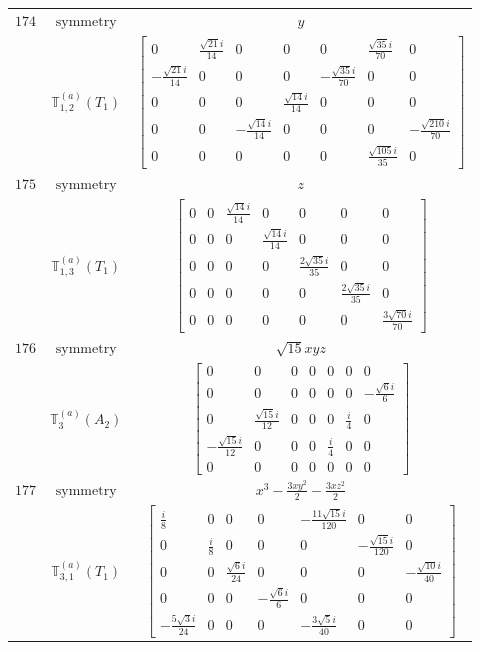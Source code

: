 \documentclass[fleqn,8pt,landscape]{jsarticle}
\begin{document}
\begin{longtable}{ccc}
$ 174 $ & $ \text{symmetry} $ & $ y $ \\
$  $ & $ \mathbb{T}_{1,2}^{(a)}(T_{1}) $ & $ \begin{bmatrix} 0 & \frac{\sqrt{21} i}{14} & 0 & 0 & 0 & \frac{\sqrt{35} i}{70} & 0 \\ - \frac{\sqrt{21} i}{14} & 0 & 0 & 0 & - \frac{\sqrt{35} i}{70} & 0 & 0 \\ 0 & 0 & 0 & \frac{\sqrt{14} i}{14} & 0 & 0 & 0 \\ 0 & 0 & - \frac{\sqrt{14} i}{14} & 0 & 0 & 0 & - \frac{\sqrt{210} i}{70} \\ 0 & 0 & 0 & 0 & 0 & \frac{\sqrt{105} i}{35} & 0 \end{bmatrix} $ \\ \hline
$ 175 $ & $ \text{symmetry} $ & $ z $ \\
$  $ & $ \mathbb{T}_{1,3}^{(a)}(T_{1}) $ & $ \begin{bmatrix} 0 & 0 & \frac{\sqrt{14} i}{14} & 0 & 0 & 0 & 0 \\ 0 & 0 & 0 & \frac{\sqrt{14} i}{14} & 0 & 0 & 0 \\ 0 & 0 & 0 & 0 & \frac{2 \sqrt{35} i}{35} & 0 & 0 \\ 0 & 0 & 0 & 0 & 0 & \frac{2 \sqrt{35} i}{35} & 0 \\ 0 & 0 & 0 & 0 & 0 & 0 & \frac{3 \sqrt{70} i}{70} \end{bmatrix} $ \\ \hline
$ 176 $ & $ \text{symmetry} $ & $ \sqrt{15} x y z $ \\
$  $ & $ \mathbb{T}_{3}^{(a)}(A_{2}) $ & $ \begin{bmatrix} 0 & 0 & 0 & 0 & 0 & 0 & 0 \\ 0 & 0 & 0 & 0 & 0 & 0 & - \frac{\sqrt{6} i}{6} \\ 0 & \frac{\sqrt{15} i}{12} & 0 & 0 & 0 & \frac{i}{4} & 0 \\ - \frac{\sqrt{15} i}{12} & 0 & 0 & 0 & \frac{i}{4} & 0 & 0 \\ 0 & 0 & 0 & 0 & 0 & 0 & 0 \end{bmatrix} $ \\ \hline
$ 177 $ & $ \text{symmetry} $ & $ x^{3} - \frac{3 x y^{2}}{2} - \frac{3 x z^{2}}{2} $ \\
$  $ & $ \mathbb{T}_{3,1}^{(a)}(T_{1}) $ & $ \begin{bmatrix} \frac{i}{8} & 0 & 0 & 0 & - \frac{11 \sqrt{15} i}{120} & 0 & 0 \\ 0 & \frac{i}{8} & 0 & 0 & 0 & - \frac{\sqrt{15} i}{120} & 0 \\ 0 & 0 & \frac{\sqrt{6} i}{24} & 0 & 0 & 0 & - \frac{\sqrt{10} i}{40} \\ 0 & 0 & 0 & - \frac{\sqrt{6} i}{6} & 0 & 0 & 0 \\ - \frac{5 \sqrt{3} i}{24} & 0 & 0 & 0 & - \frac{3 \sqrt{5} i}{40} & 0 & 0 \end{bmatrix} $ \\ \hline

\end{longtable}
\end{document}
